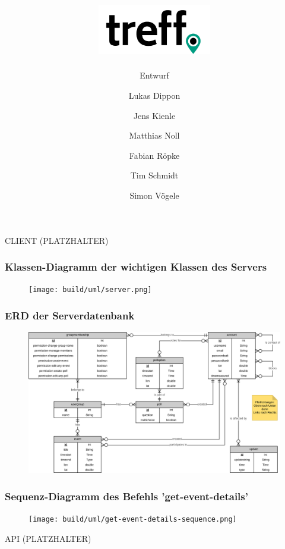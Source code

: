 \documentclass[aspectratio=1610]{beamer}
\title{\includegraphics[width = 50mm]{images/logo_crop.png}}
\subtitle{\huge Entwurf}
\author{Lukas Dippon
	\and Jens Kienle
	\and Matthias Noll
	\and Fabian Röpke
	\and Tim Schmidt
	\and Simon Vögele}
\begin{document}
	\begin{frame}[plain]
	\maketitle
	\end{frame}

	\begin{frame}[plain]
        CLIENT (PLATZHALTER)
	\end{frame}

	\begin{frame}[plain]
        \frametitle{Klassen-Diagramm der wichtigen Klassen des Servers}
        \begin{figure}[!htb]
            \centering
            \texttt{[image: build/uml/server.png]}
        \end{figure}
	\end{frame}

	\begin{frame}[plain]
        \frametitle{ERD der Serverdatenbank}
        \begin{figure}[!htb]
            \centering
            \includegraphics[width = \columnwidth]{images/erd-complete.png}
        \end{figure}
    \end{frame}

	\begin{frame}[plain]
        \frametitle{Sequenz-Diagramm des Befehls 'get-event-details'}
        \begin{figure}[!htb]
            \centering
            \texttt{[image: build/uml/get-event-details-sequence.png]}
        \end{figure}
    \end{frame}

	\begin{frame}[plain]
        API (PLATZHALTER)
	\end{frame}
\end{document}
